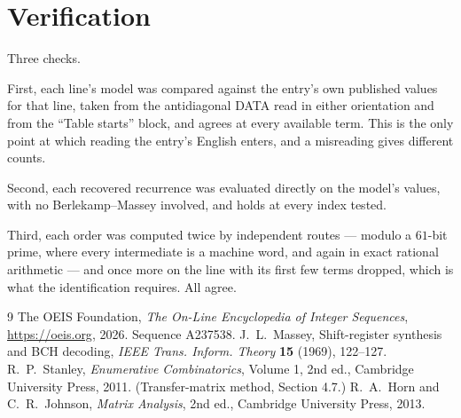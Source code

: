 \documentclass[11pt,a4paper]{article}
\theoremstyle{plain}
\theoremstyle{definition}
\begin{document}
\section{Verification}

Three checks.

First, each line's model was compared against the entry's own published values for that line,
taken from the antidiagonal DATA read in either orientation and from the ``Table starts''
block, and agrees at every available term. This is the only point at which reading the entry's
English enters, and a misreading gives different counts.

Second, each recovered recurrence was evaluated directly on the model's values, with no
Berlekamp--Massey involved, and holds at every index tested.

Third, each order was computed twice by independent routes --- modulo a $61$-bit prime, where
every intermediate is a machine word, and again in exact rational arithmetic --- and once more
on the line with its first few terms dropped, which is what the identification requires. All
agree.

\begin{thebibliography}{9}
 The OEIS Foundation, \emph{The On-Line Encyclopedia of Integer
Sequences}, \url{https://oeis.org}, 2026. Sequence A237538.
 J.~L.~Massey, Shift-register synthesis and BCH decoding, \emph{IEEE
Trans. Inform. Theory} \textbf{15} (1969), 122--127.
 R.~P.~Stanley, \emph{Enumerative Combinatorics}, Volume 1, 2nd ed.,
Cambridge University Press, 2011. (Transfer-matrix method, Section 4.7.)
 R.~A.~Horn and C.~R.~Johnson, \emph{Matrix Analysis}, 2nd ed., Cambridge
University Press, 2013.
\end{thebibliography}
\end{document}
